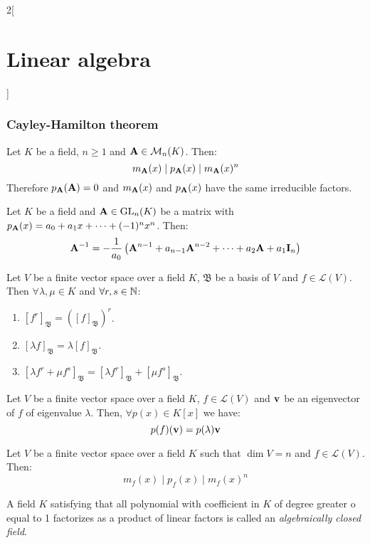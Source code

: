 \documentclass[../../../main.tex]{subfiles}
\begin{document}
\begin{multicols}{2}[\section{Linear algebra}]
  \subsubsection{Cayley-Hamilton theorem}
  \begin{theorem}
    Let $K$ be a field, $n\geq 1$ and $\boldsymbol{\mathrm{A}}\in\mathcal{M}_n(K)$. Then: $$m_{\boldsymbol{\mathrm{A}}}(x)\mid p_{\boldsymbol{\mathrm{A}}}(x)\mid m_{\boldsymbol{\mathrm{A}}}(x)^n$$ Therefore $p_{\boldsymbol{\mathrm{A}}}(\boldsymbol{\mathrm{A}})=0$ and $m_{\boldsymbol{\mathrm{A}}}(x)$ and $p_{\boldsymbol{\mathrm{A}}}(x)$ have the same irreducible factors.
  \end{theorem}
  \begin{corollary}
    Let $K$ be a field and $\boldsymbol{\mathrm{A}}\in\mathrm{GL}_n(K)$ be a matrix with $p_{\boldsymbol{\mathrm{A}}}(x)=a_0+a_1x+\cdots+(-1)^nx^n$. Then: $$\boldsymbol{\mathrm{A}}^{-1}=-\frac{1}{a_0}\left(\boldsymbol{\mathrm{A}}^{n-1}+a_{n-1}\boldsymbol{\mathrm{A}}^{n-2}+\cdots+a_2\boldsymbol{\mathrm{A}}+a_1\boldsymbol{\mathrm{I}}_n\right)$$
  \end{corollary}
  \begin{lemma}
    Let $V$ be a finite vector space over a field $K$, $\mathfrak{B}$ be a basis of $V$ and $f\in\mathcal{L}(V)$. Then $\forall\lambda,\mu\in K$ and $\forall r,s\in\mathbb{N}$:
    \begin{enumerate}
      \item $[f^r]_\mathfrak{B}={\left([f]_\mathfrak{B}\right)}^r$.
      \item $[\lambda f]_\mathfrak{B}=\lambda[f]_\mathfrak{B}$.
      \item $[\lambda f^r+\mu f^s]_\mathfrak{B}=[\lambda f^r]_\mathfrak{B}+[\mu f^s]_\mathfrak{B}$.
    \end{enumerate}
  \end{lemma}
  \begin{lemma}
    Let $V$ be a finite vector space over a field $K$, $f\in\mathcal{L}(V)$ and $\boldsymbol{\mathrm{v}}$ be an eigenvector of $f$ of eigenvalue $\lambda$. Then, $\forall p(x)\in K[x]$ we have: $$p(f)(\boldsymbol{\mathrm{v}})=p(\lambda)\boldsymbol{\mathrm{v}}$$
  \end{lemma}
  \begin{theorem}
    Let $V$ be a finite vector space over a field $K$ such that $\dim V=n$ and $f\in\mathcal{L}(V)$. Then: $$m_f(x)\mid p_f(x)\mid m_f(x)^n$$
  \end{theorem}
  \begin{definition}
    A field $K$ satisfying that all polynomial with coefficient in $K$ of degree greater o equal to 1 factorizes as a product of linear factors is called an \textit{algebraically closed field}.

\end{definition}
\end{multicols}
\end{document}

